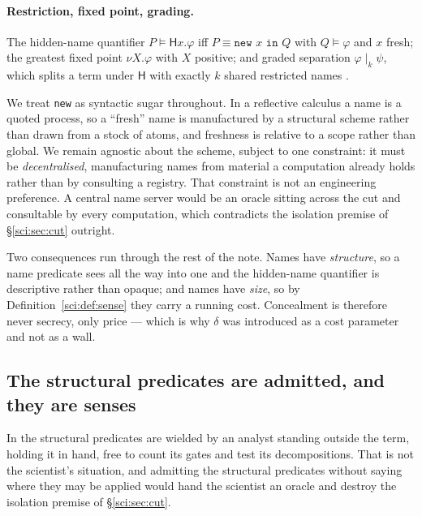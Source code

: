 \paragraph{Restriction, fixed point, grading.} The hidden-name quantifier
$P \models \mathsf{H}x.\varphi$ iff $P \equiv \texttt{new } x \texttt{ in } Q$ with
$Q \models \varphi$ and $x$ fresh; the greatest fixed point $\nu X.\varphi$ with $X$ positive; and
graded separation $\varphi \mid_k \psi$, which splits a term under $\mathsf{H}$ with exactly $k$
shared restricted names \cite[\S2.3]{ClassifierNote}.

\begin{remark}
\label{sci:rem:sugar}
We treat \texttt{new} as syntactic sugar throughout. In a reflective calculus a name is a quoted
process, so a ``fresh'' name is manufactured by a structural scheme rather than drawn from a stock of
atoms, and freshness is relative to a scope rather than global. We remain agnostic about the scheme,
subject to one constraint: it must be \emph{decentralised}, manufacturing names from material a
computation already holds rather than by consulting a registry. That constraint is not an engineering
preference. A central name server would be an oracle sitting across the cut and consultable by every
computation, which contradicts the isolation premise of \S\ref{sci:sec:cut} outright.

Two consequences run through the rest of the note. Names have \emph{structure}, so a name predicate
sees all the way into one and the hidden-name quantifier is descriptive rather than opaque; and names
have \emph{size}, so by Definition~\ref{sci:def:sense} they carry a running cost. Concealment is therefore
never secrecy, only price --- which is why $\delta$ was introduced as a cost parameter and not as a
wall.
\end{remark}

\subsection{The structural predicates are admitted, and they are senses}\label{sci:S3.2}

In \cite{ClassifierNote} the structural predicates are wielded by an analyst standing outside the
term, holding it in hand, free to count its gates and test its decompositions. That is not the
scientist's situation, and admitting the structural predicates without saying where they may be
applied would hand the scientist an oracle and destroy the isolation premise of \S\ref{sci:sec:cut}.

